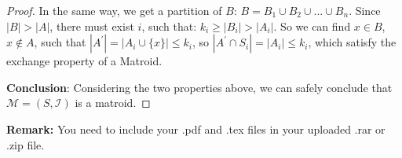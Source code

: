 \documentclass[12pt,a4paper]{article}
\theoremstyle{definition}
\begin{document}
\begin{enumerate}
\begin{proof}
        In the same way, we get a partition of $B$: $B = B_1 \cup B_2 \cup ... \cup B_n$. Since $|B| > |A|$, there must exist $i$, such that: $k_i \geq |B_i| > |A_i|$. So we can find $x \in B$, $x \notin A$, such that 
        $|A^{'}| = |A_i \cup \{x\}| \leq  k_i$, so $|A^{'} \cap S_i| = |A_i| \leq k_i$, which satisfy the exchange property of a Matroid.
        
        \textbf{Conclusion}: Considering the two properties above, we can safely conclude that $\mathcal{M}=(S, \mathcal{I})$ is a matroid.
    \end{proof}



\end{enumerate}

\vspace{20pt}

\textbf{Remark:} You need to include your .pdf and .tex files in your uploaded .rar or .zip file.

\end{document}
